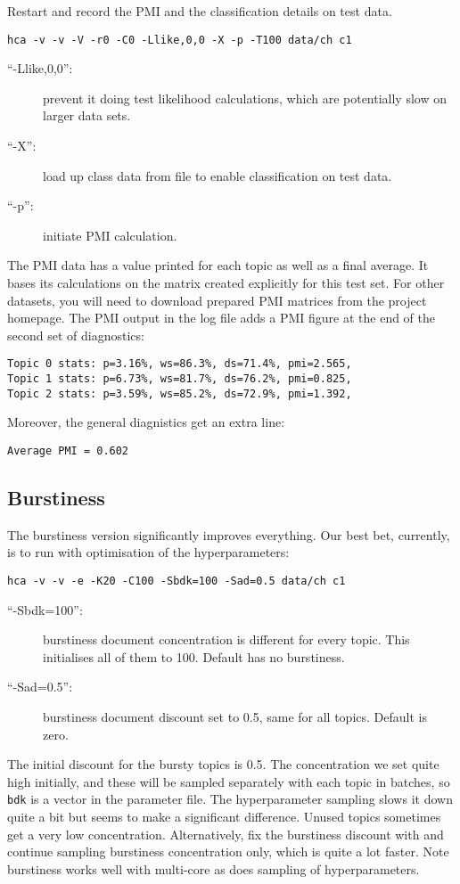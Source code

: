 \documentclass[a4paper,english]{article}
\begin{document}
Restart and record the 
PMI and the classification details on test data.
\begin{verbatim}
hca -v -v -V -r0 -C0 -Llike,0,0 -X -p -T100 data/ch c1
\end{verbatim}
\begin{description}
\item[``-Llike,0,0'':] prevent it 
doing test likelihood calculations, which are potentially slow
on larger data sets.
\item[``-X'':] load up class data from  file to
enable classification on test data.
\item[``-p'':] initiate PMI calculation.
\end{description}
The PMI data has a value printed for each topic as well as a 
final average.  It bases its calculations on the matrix
 created explicitly for this test set.
For other datasets, you will need to download prepared
PMI matrices from the project homepage.
The PMI output in the log file 
adds a PMI figure at the end of the second set of
diagnostics:
\begin{verbatim}
Topic 0 stats: p=3.16%, ws=86.3%, ds=71.4%, pmi=2.565,
Topic 1 stats: p=6.73%, ws=81.7%, ds=76.2%, pmi=0.825,
Topic 2 stats: p=3.59%, ws=85.2%, ds=72.9%, pmi=1.392,
\end{verbatim}
Moreover, the general diagnistics get an extra line:
\begin{verbatim}
Average PMI = 0.602
\end{verbatim}

\subsection{Burstiness}

The burstiness version significantly improves everything.
Our best bet, currently, is to run
with optimisation of the hyperparameters:
\begin{verbatim}
hca -v -v -e -K20 -C100 -Sbdk=100 -Sad=0.5 data/ch c1
\end{verbatim}
\begin{description}
\item[``-Sbdk=100'':]  burstiness document concentration is different
for every topic.  This initialises all of them to 100.
Default has no burstiness.
\item[``-Sad=0.5'':] burstiness document discount set to 
0.5, same for all topics.  Default is zero.
\end{description}
The initial discount for the bursty topics is
0.5.   The concentration we set quite high initially, 
and these will be sampled separately with
each topic in batches, so \texttt{bdk} is a vector in the
parameter file.
The hyperparameter sampling slows it down quite a bit but seems to
make a significant difference.  Unused topics sometimes
get a very low concentration.
Alternatively, fix the burstiness discount with 
 and continue sampling burstiness concentration only,
which is quite a lot faster.
Note burstiness works well with multi-core as does 
sampling of hyperparameters.
\end{document}
